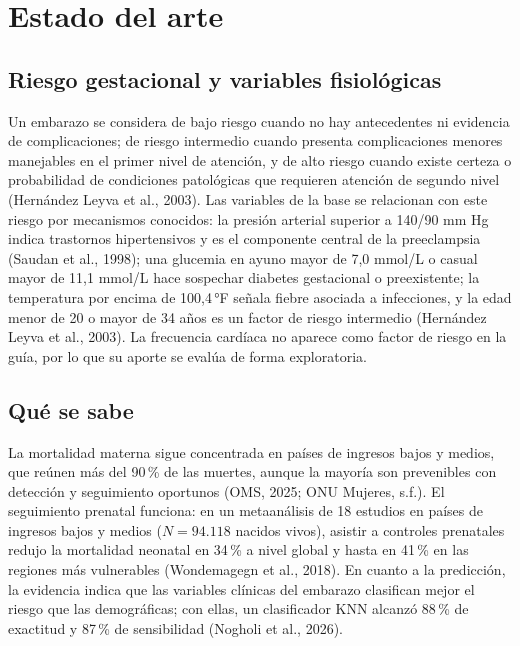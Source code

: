 \section{Estado del arte}

\subsection{Riesgo gestacional y variables fisiológicas}
Un embarazo se considera de bajo riesgo cuando no hay antecedentes ni evidencia
de complicaciones; de riesgo intermedio cuando presenta complicaciones menores
manejables en el primer nivel de atención, y de alto riesgo cuando existe certeza
o probabilidad de condiciones patológicas que requieren atención de segundo
nivel (Hernández Leyva et al., 2003). Las variables de la base se relacionan con
este riesgo por mecanismos conocidos: la presión arterial superior a 140/90 mm Hg
indica trastornos hipertensivos y es el componente central de la preeclampsia
(Saudan et al., 1998); una glucemia en ayuno mayor de 7,0 mmol/L o casual mayor de
11,1 mmol/L hace sospechar diabetes gestacional o preexistente; la temperatura
por encima de 100,4\,°F señala fiebre asociada a infecciones, y la edad menor de 20
o mayor de 34 años es un factor de riesgo intermedio (Hernández Leyva et al.,
2003). La frecuencia cardíaca no aparece como factor de riesgo en la guía, por lo
que su aporte se evalúa de forma exploratoria.

\subsection{Qué se sabe}
La mortalidad materna sigue concentrada en países de ingresos bajos y medios, que
reúnen más del 90\,\% de las muertes, aunque la mayoría son prevenibles con
detección y seguimiento oportunos (OMS, 2025; ONU Mujeres, s.f.). El seguimiento
prenatal funciona: en un metaanálisis de 18 estudios en países de ingresos bajos y
medios ($N = 94.118$ nacidos vivos), asistir a controles prenatales redujo la
mortalidad neonatal en 34\,\% a nivel global y hasta en 41\,\% en las regiones más
vulnerables (Wondemagegn et al., 2018). En cuanto a la predicción, la evidencia
indica que las variables clínicas del embarazo clasifican mejor el riesgo que las
demográficas; con ellas, un clasificador KNN alcanzó 88\,\% de exactitud y 87\,\% de
sensibilidad (Nogholi et al., 2026).

